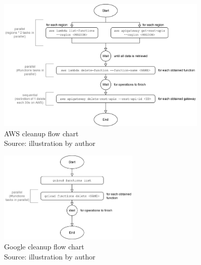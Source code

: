 \begin{figure}[htp]
\begin{center}
\includegraphics[width=0.9\textwidth]{bilder/AWS_Cleanup_Flow.png}
\captionsetup{justification=centering, labelfont=bf}
\caption[AWS cleanup flow chart]{AWS cleanup flow chart\\Source: illustration by author}
\label{fig:aws_cleanup}
\end{center}
\end{figure}

\begin{figure}[htp]
\begin{center}
\includegraphics[width=0.6\textwidth]{bilder/Google_Cleanup_Flow.png}
\captionsetup{justification=centering, labelfont=bf}
\caption[Google cleanup flow chart]{Google cleanup flow chart\\Source: illustration by author}
\label{fig:google_cleanup}
\end{center}
\end{figure}


